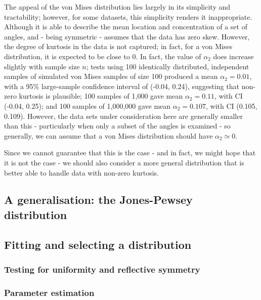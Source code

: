 \documentclass[../../ArchStats.tex]{subfiles}
\begin{document}
The appeal of the von Mises distribution lies largely in its simplicity and tractability; however, for some datasets, this simplicity renders it inappropriate. Although it is able to describe the mean location and concentration of a set of angles, and - being symmetric - assumes that the data has zero skew. However, the degree of kurtosis in the data is not captured; in fact, for a von Mises distribution, it is expected to be close to 0. In fact, the value of $\alpha_2$ does increase slightly with sample size $n$; tests using 100 identically distributed, independent samples of simulated von Mises samples of size 100 produced a mean $\alpha_2 = 0.01$, with a 95\% large-sample confidence interval of (-0.04, 0.24), suggesting that non-zero kurtosis is plausible; 100 samples of 1,000 gave mean $\alpha_2 =  0.11$, with CI (-0.04, 0.25); and 100 samples of 1,000,000 gave mean $\alpha_2 = 0.107$, with CI (0.105, 0.109). However, the data sets under consideration here are generally smaller than this - particularly when only a subset of the angles is examined - so generally, we can assume that a von Mises distribution should have $\alpha_2 \simeq 0$.

Since we cannot guarantee that this is the case - and in fact, we might hope that it is not the case  - we should also consider a more general distribution that is better able to handle data with non-zero kurtosis.


\subsection{A generalisation: the Jones-Pewsey distribution}


\subsection{Fitting and selecting a distribution}

\subsubsection{Testing for uniformity and reflective symmetry}

\subsubsection{Parameter estimation}
\end{document}
